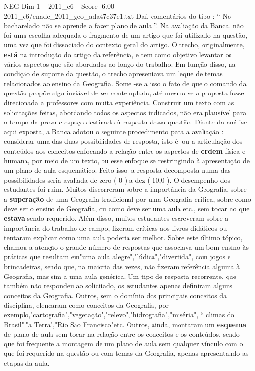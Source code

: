 \begin{textsample}{NEG Dim 1 – 2011\_c6 – Score -6.00 – 2011\_c6/enade\_2011\_geo\_ada47c37e1.txt}
Daí, comentários do tipo : “ No bacharelado não se aprende a fazer plano de aula ”.
Na avaliação da Banca, não foi uma escolha adequada o fragmento de um artigo que foi utilizado na questão, uma vez que foi dissociado do contexto geral do artigo.
O trecho, originalmente, \textbf{está} na introdução do artigo da referência, e tem como objetivo levantar os vários aspectos que são abordados ao longo do trabalho.
Em função disso, na condição de suporte da questão, o trecho apresentava um leque de temas relacionados ao ensino da Geografia.
Some -se a isso o fato de que o comando da questão propõe algo inviável de ser contemplado, até mesmo se a proposta fosse direcionada a professores com muita experiência.
Construir um texto com as solicitações feitas, abordando todos os aspectos indicados, não era plausível para o tempo da prova e espaço destinado à resposta dessa questão.
Diante da análise aqui exposta, a Banca adotou o seguinte procedimento para a avaliação : considerar uma das duas possibilidades de resposta, isto é, ou a articulação dos conteúdos aos conceitos enfocando a relação entre os aspectos de \textbf{ordem} física e humana, por meio de um texto, ou esse enfoque se restringindo à apresentação de um plano de aula esquemático.
Feito isso, a resposta decomposta numa das possibilidades seria avaliada de zero ( 0 ) a dez ( 10,0 ).
O desempenho dos estudantes foi ruim.
Muitos discorreram sobre a importância da Geografia, sobre a \textbf{superação} de uma Geografia tradicional por uma Geografia crítica, sobre como deve ser o ensino de Geografia, ou como deve ser uma aula etc., sem tocar no que \textbf{estava} sendo requerido.
Além disso, muitos estudantes escreveram sobre a importância do trabalho de campo, fizeram críticas aos livros didáticos ou tentaram explicar como uma aula poderia ser melhor.
Sobre este último tópico, chamou a atenção o grande número de respostas que associava um bom ensino às práticas que resultam em"uma aula alegre","lúdica","divertida", com jogos e brincadeiras, sendo que, na maioria das vezes, não fizeram referência alguma à Geografia, mas sim a uma aula genérica.
Um tipo de resposta recorrente, que também não respondeu ao solicitado, os estudantes apenas definiram alguns conceitos da Geografia.
Outros, sem o domínio dos principais conceitos da disciplina, elencaram como conceitos da Geografia, por exemplo,"cartografia","vegetação","relevo","hidrografia","miséria", “ climas do Brasil","a Terra","Rio São Francisco"etc.
Outros, ainda, montaram um \textbf{esquema} de plano de aula sem tocar na relação entre os conceitos e os conteúdos, sendo que foi frequente a montagem de um plano de aula sem qualquer vínculo com o que foi requerido na questão ou com temas da Geografia, apenas apresentando as etapas da aula.

\end{textsample}
